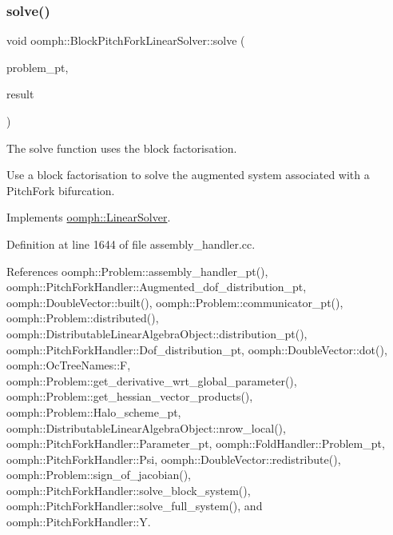 \mbox{\label{classoomph_1_1BlockPitchForkLinearSolver_ad196867613954a8fabd318b50e2aadc6}} 
\subsubsection{\texorpdfstring{solve()}{solve()}\hspace{0.1cm}{\footnotesize\ttfamily [1/3]}}
{\footnotesize\ttfamily void oomph\+::\+Block\+Pitch\+Fork\+Linear\+Solver\+::solve (\begin{DoxyParamCaption}\item[{\hyperlink{classoomph_1_1Problem}{Problem} $\ast$const \&}]{problem\+\_\+pt,  }\item[{\hyperlink{classoomph_1_1DoubleVector}{Double\+Vector} \&}]{result }\end{DoxyParamCaption})\hspace{0.3cm}{\ttfamily [virtual]}}



The solve function uses the block factorisation. 

Use a block factorisation to solve the augmented system associated with a Pitch\+Fork bifurcation. 

Implements \hyperlink{classoomph_1_1LinearSolver_a15ce22542b74ed1826ea485edacbeb6e}{oomph\+::\+Linear\+Solver}.



Definition at line 1644 of file assembly\+\_\+handler.\+cc.



References oomph\+::\+Problem\+::assembly\+\_\+handler\+\_\+pt(), oomph\+::\+Pitch\+Fork\+Handler\+::\+Augmented\+\_\+dof\+\_\+distribution\+\_\+pt, oomph\+::\+Double\+Vector\+::built(), oomph\+::\+Problem\+::communicator\+\_\+pt(), oomph\+::\+Problem\+::distributed(), oomph\+::\+Distributable\+Linear\+Algebra\+Object\+::distribution\+\_\+pt(), oomph\+::\+Pitch\+Fork\+Handler\+::\+Dof\+\_\+distribution\+\_\+pt, oomph\+::\+Double\+Vector\+::dot(), oomph\+::\+Oc\+Tree\+Names\+::F, oomph\+::\+Problem\+::get\+\_\+derivative\+\_\+wrt\+\_\+global\+\_\+parameter(), oomph\+::\+Problem\+::get\+\_\+hessian\+\_\+vector\+\_\+products(), oomph\+::\+Problem\+::\+Halo\+\_\+scheme\+\_\+pt, oomph\+::\+Distributable\+Linear\+Algebra\+Object\+::nrow\+\_\+local(), oomph\+::\+Pitch\+Fork\+Handler\+::\+Parameter\+\_\+pt, oomph\+::\+Fold\+Handler\+::\+Problem\+\_\+pt, oomph\+::\+Pitch\+Fork\+Handler\+::\+Psi, oomph\+::\+Double\+Vector\+::redistribute(), oomph\+::\+Problem\+::sign\+\_\+of\+\_\+jacobian(), oomph\+::\+Pitch\+Fork\+Handler\+::solve\+\_\+block\+\_\+system(), oomph\+::\+Pitch\+Fork\+Handler\+::solve\+\_\+full\+\_\+system(), and oomph\+::\+Pitch\+Fork\+Handler\+::Y.

